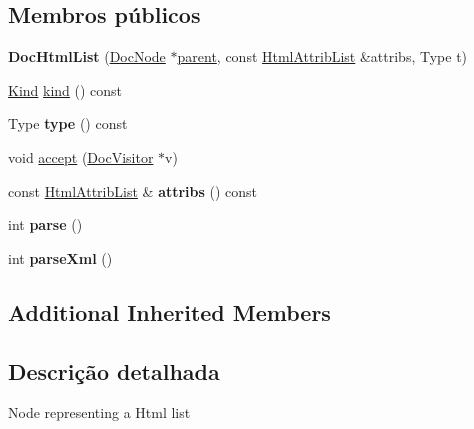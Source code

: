 \subsection*{Membros públicos}
\begin{DoxyCompactItemize}
\item 
\hypertarget{class_doc_html_list_a59a60afa9ad63b59b70081ddf2d996bc}{{\bfseries Doc\-Html\-List} (\hyperlink{class_doc_node}{Doc\-Node} $\ast$\hyperlink{class_doc_node_abd7f070d6b0a38b4da71c2806578d19d}{parent}, const \hyperlink{class_html_attrib_list}{Html\-Attrib\-List} \&attribs, Type t)}\label{class_doc_html_list_a59a60afa9ad63b59b70081ddf2d996bc}

\item 
\hyperlink{class_doc_node_aa10c9e8951b8ccf714a59ec321bdac5b}{Kind} \hyperlink{class_doc_html_list_aa9d037bed9f9a083d0cd01485637d843}{kind} () const 
\item 
\hypertarget{class_doc_html_list_afbd0fa31db28593e9669c3c56711c0a7}{Type {\bfseries type} () const }\label{class_doc_html_list_afbd0fa31db28593e9669c3c56711c0a7}

\item 
void \hyperlink{class_doc_html_list_a7ba716e854ae2f8f87a4eb2140e302b6}{accept} (\hyperlink{class_doc_visitor}{Doc\-Visitor} $\ast$v)
\item 
\hypertarget{class_doc_html_list_aae3c838ea3d3273b35d07e9965a8985e}{const \hyperlink{class_html_attrib_list}{Html\-Attrib\-List} \& {\bfseries attribs} () const }\label{class_doc_html_list_aae3c838ea3d3273b35d07e9965a8985e}

\item 
\hypertarget{class_doc_html_list_a67007fc2be130666fbf3b065022756f4}{int {\bfseries parse} ()}\label{class_doc_html_list_a67007fc2be130666fbf3b065022756f4}

\item 
\hypertarget{class_doc_html_list_a80866a0f93fec97bbcf5b54a48fd8ead}{int {\bfseries parse\-Xml} ()}\label{class_doc_html_list_a80866a0f93fec97bbcf5b54a48fd8ead}

\end{DoxyCompactItemize}
\subsection*{Additional Inherited Members}


\subsection{Descrição detalhada}
Node representing a Html list 

